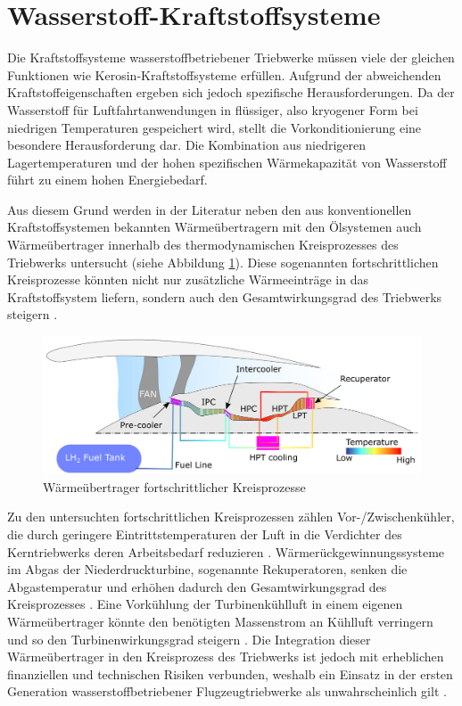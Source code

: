 \section{Wasserstoff-Kraftstoffsysteme}

Die Kraftstoffsysteme wasserstoffbetriebener Triebwerke müssen viele der gleichen Funktionen wie Kerosin-Kraftstoffsysteme erfüllen. Aufgrund der abweichenden Kraftstoffeigenschaften ergeben sich jedoch spezifische Herausforderungen. Da der Wasserstoff für Luftfahrtanwendungen in flüssiger, also kryogener Form bei niedrigen Temperaturen gespeichert wird, stellt die Vorkonditionierung eine besondere Herausforderung dar. Die Kombination aus niedrigeren Lagertemperaturen und der hohen spezifischen Wärmekapazität von Wasserstoff führt zu einem hohen Energiebedarf. \cite{Rompokos.2024, Sethi.2022}

Aus diesem Grund werden in der Literatur neben den aus konventionellen Kraftstoffsystemen bekannten Wärmeübertragern mit den Ölsystemen auch Wärmeübertrager innerhalb des thermodynamischen Kreisprozesses des Triebwerks untersucht (siehe Abbildung \ref{fig:2.2}). Diese sogenannten fortschrittlichen Kreisprozesse könnten nicht nur zusätzliche Wärmeeinträge in das Kraftstoffsystem liefern, sondern auch den Gesamtwirkungsgrad des Triebwerks steigern \cite{Tacconi.2023}.

\begin{figure}[ht]
\centering
\includegraphics[width=0.75\linewidth]{4_Abbildungen/2_Hauptteil/Advanced Cycles.png}
  \caption{Wärmeübertrager fortschrittlicher Kreisprozesse \cite{Sethi.2022}}
  \label{fig:2.2}
\end{figure}
\FloatBarrier 

Zu den untersuchten fortschrittlichen Kreisprozessen zählen Vor-/Zwischenkühler, die durch geringere Eintrittstemperaturen der Luft in die Verdichter des Kerntriebwerks deren Arbeitsbedarf reduzieren \cite{Abedi.2022}. Wärmerückgewinnungssysteme im Abgas der Niederdruckturbine, sogenannte Rekuperatoren, senken die Abgastemperatur und erhöhen dadurch den Gesamtwirkungsgrad des Kreisprozesses \cite{Brewer.1991}. Eine Vorkühlung der Turbinenkühlluft in einem eigenen Wärmeübertrager könnte den benötigten Massenstrom an Kühlluft verringern und so den Turbinenwirkungsgrad steigern \cite{Brewer.1991}. Die Integration dieser Wärmeübertrager in den Kreisprozess des Triebwerks ist jedoch mit erheblichen finanziellen und technischen Risiken verbunden, weshalb ein Einsatz in der ersten Generation wasserstoffbetriebener Flugzeugtriebwerke als unwahrscheinlich gilt \cite{Rompokos.2024, Huete.2021}. 


